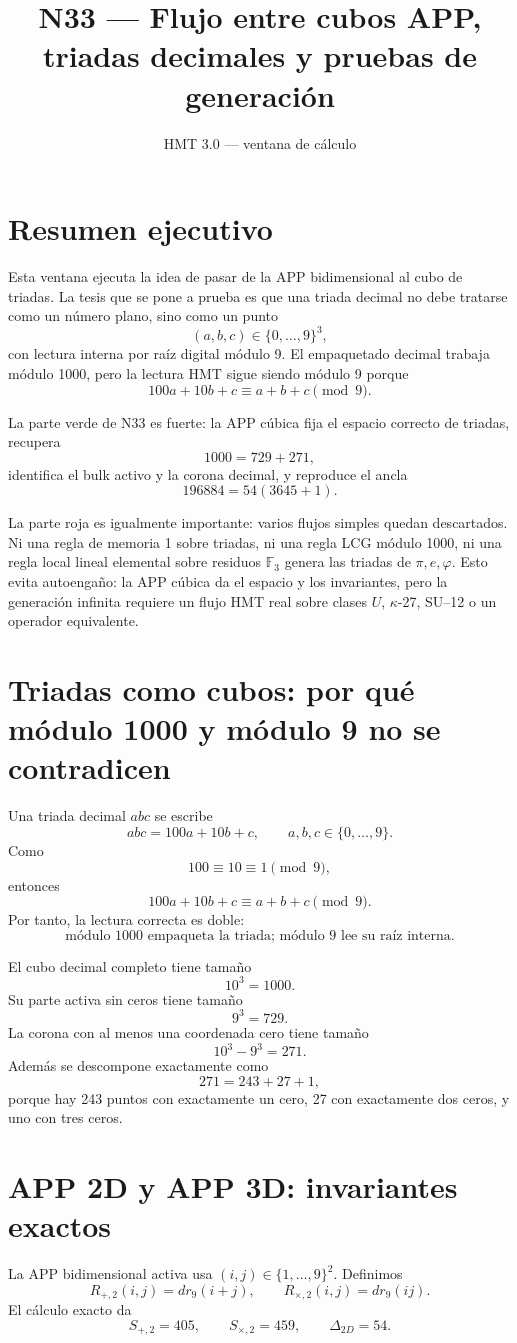 \documentclass[11pt,a4paper]{article}
\title{\bfseries N33 --- Flujo entre cubos APP, triadas decimales y pruebas de generación}
\author{HMT 3.0 --- ventana de cálculo}
\date{}
\begin{document}
\maketitle

\section*{Resumen ejecutivo}
Esta ventana ejecuta la idea de pasar de la APP bidimensional al cubo de triadas. La tesis que se pone a prueba es que una triada decimal no debe tratarse como un número plano, sino como un punto
\[
(a,b,c)\in\{0,\ldots,9\}^{3},
\]
con lectura interna por raíz digital módulo 9. El empaquetado decimal trabaja módulo 1000, pero la lectura HMT sigue siendo módulo 9 porque
\[
100a+10b+c\equiv a+b+c \pmod 9.
\]

La parte verde de N33 es fuerte: la APP cúbica fija el espacio correcto de triadas, recupera
\[
1000=729+271,
\]
identifica el bulk activo y la corona decimal, y reproduce el ancla
\[
196884=54(3645+1).
\]

La parte roja es igualmente importante: varios flujos simples quedan descartados. Ni una regla de memoria 1 sobre triadas, ni una regla LCG módulo 1000, ni una regla local lineal elemental sobre residuos \(\mathbb F_3\) genera las triadas de \(\pi,e,\varphi\). Esto evita autoengaño: la APP cúbica da el espacio y los invariantes, pero la generación infinita requiere un flujo HMT real sobre clases \(U\), \(\kappa\)-27, SU--12 o un operador equivalente.

\section{Triadas como cubos: por qué módulo 1000 y módulo 9 no se contradicen}
Una triada decimal \(abc\) se escribe
\[
abc=100a+10b+c,
\qquad a,b,c\in\{0,\ldots,9\}.
\]
Como
\[
100\equiv10\equiv1\pmod 9,
\]
entonces
\[
100a+10b+c\equiv a+b+c\pmod 9.
\]
Por tanto, la lectura correcta es doble:
\[
\boxed{\text{módulo }1000\text{ empaqueta la triada; módulo }9\text{ lee su raíz interna.}}
\]

El cubo decimal completo tiene tamaño
\[
10^3=1000.
\]
Su parte activa sin ceros tiene tamaño
\[
9^3=729.
\]
La corona con al menos una coordenada cero tiene tamaño
\[
10^3-9^3=271.
\]
Además se descompone exactamente como
\[
271=243+27+1,
\]
porque hay 243 puntos con exactamente un cero, 27 con exactamente dos ceros, y uno con tres ceros.

\section{APP 2D y APP 3D: invariantes exactos}
La APP bidimensional activa usa \((i,j)\in\{1,\ldots,9\}^2\). Definimos
\[
R_{+,2}(i,j)=dr_9(i+j),
\qquad
R_{\times,2}(i,j)=dr_9(ij).
\]
El cálculo exacto da
\[
S_{+,2}=405,
\qquad
S_{\times,2}=459,
\qquad
\Delta_{2D}=54.
\]
\end{document}

